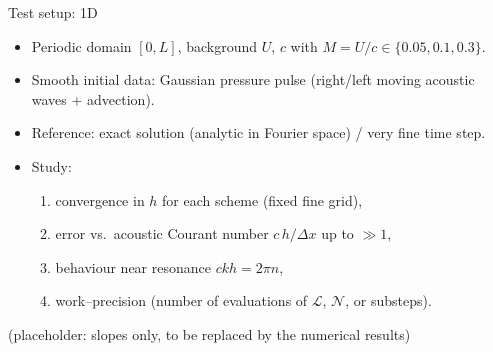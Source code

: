 \documentclass[aspectratio=169,10pt]{beamer}
\newcommand{\LL}{\mathcal{L}}   %
\newcommand{\NN}{\mathcal{N}}   %
\begin{document}
	\begin{frame}{Test setup: 1D}
		\begin{itemize}
			\item Periodic domain $[0,L]$, background $U$, $c$ with $M=U/c\in\{0.05,0.1,0.3\}$.
			\item Smooth initial data: Gaussian pressure pulse (right/left moving acoustic waves + advection).
			\item Reference: exact solution (analytic in Fourier space) / very fine time step.
			\item Study:
			\begin{enumerate}
				\item convergence in $h$ for each scheme (fixed fine grid),
				\item error vs.\ acoustic Courant number $c\,h/\Delta x$ up to $\gg1$,
				\item behaviour near resonance $ckh=2\pi n$,
				\item work--precision (number of evaluations of $\LL$, $\NN$, or substeps).
			\end{enumerate}
		\end{itemize}
		\vspace{0.5em}
		\begin{center}
		\end{center}
		{\scriptsize (placeholder: slopes only, to be replaced by the numerical results)}
	\end{frame}
	
\end{document}
